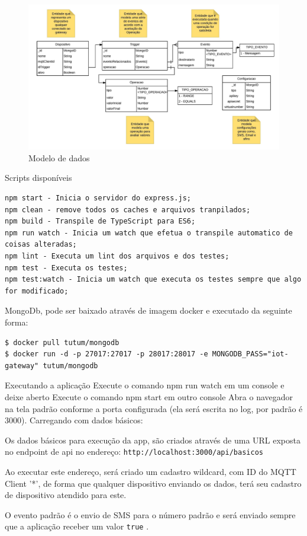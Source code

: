 \begin{figure}[h!]
	\begin{center}
		\includegraphics[width=1\textwidth]{./img/modelo-de-dados}
		\caption{Modelo de dados}
		\label{fig:modeloDeDados}
	\end{center}
\end{figure}

Scripts disponíveis
\begin{verbatim}
npm start - Inicia o servidor do express.js;
npm clean - remove todos os caches e arquivos tranpilados;
npm build - Transpile de TypeScript para ES6;
npm run watch - Inicia um watch que efetua o transpile automatico de coisas alteradas;
npm lint - Executa um lint dos arquivos e dos testes;
npm test - Executa os testes;
npm test:watch - Inicia um watch que executa os testes sempre que algo for modificado;
\end{verbatim}

MongoDb, pode ser baixado através de imagem docker e executado da seguinte forma:
\begin{verbatim}
$ docker pull tutum/mongodb
$ docker run -d -p 27017:27017 -p 28017:28017 -e MONGODB_PASS="iot-gateway" tutum/mongodb
\end{verbatim}

Executando a aplicação
Execute o comando npm run watch em um console e deixe aberto
Execute o comando npm start em outro console
Abra o navegador na tela padrão conforme a porta configurada (ela será escrita no log, por padrão é 3000).
Carregando com dados básicos:

Os dados básicos para execução da app, são criados através de uma URL exposta no endpoint de api no endereço: \verb|http://localhost:3000/api/basicos|

Ao executar este endereço, será criado um cadastro wildcard, com ID do MQTT Client '*', de forma que qualquer dispositivo enviando os dados, terá seu cadastro de dispositivo atendido para este.

O evento padrão é o envio de SMS para o número padrão e será enviado sempre que a aplicação receber um valor \verb|true|	.
